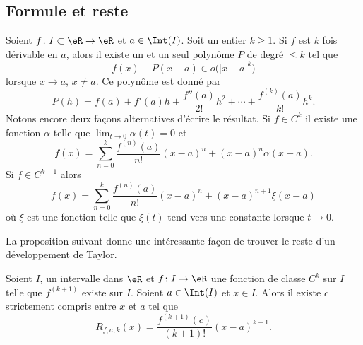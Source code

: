 \subsection{Formule et reste}

\begin{proposition}     \label{PropDevTaylorPol}
    Soient $f\colon I\subset\eR\to \eR$ et $a\in\Int(I)$. Soit un entier $k\geq 1$. Si $f$ est $k$ fois dérivable en $a$, alors il existe un et un seul polynôme $P$ de degré $\leq k$ tel que
    \begin{equation}
        f(x)-P(x-a)\in o\big( | x-a |^k \big)
    \end{equation}
    lorsque $x\to a$, $x\neq a$. Ce polynôme  est donné par
    \begin{equation}
        P(h)=f(a)+f'(a)h+\frac{ f''(a) }{ 2! }h^2+\cdots+\frac{ f^{(k)}(a) }{ k! }h^k.
    \end{equation}
    Notons encore deux façons alternatives d'écrire le résultat. Si \( f\in C^k\) il existe une fonction \( \alpha\) telle que \( \lim_{t\to 0} \alpha(t)=0\) et
    \begin{equation}
        f(x)=\sum_{n=0}^k\frac{ f^{(n)}(a) }{ n! }(x-a)^n+(x-a)^n\alpha(x-a).
    \end{equation}
    Si \( f\in C^{k+1}\) alors
    \begin{equation}        \label{EquQtpoN}
        f(x)=\sum_{n=0}^k\frac{ f^{(n)}(a) }{ n! }(x-a)^n+(x-a)^{n+1}\xi(x-a)
    \end{equation}
    où \( \xi\) est une fonction telle que \( \xi(t)\) tend vers une constante lorsque \( t\to 0\).
\end{proposition}

La proposition suivant donne une intéressante façon de trouver le reste d'un développement de Taylor.
\begin{proposition}     \label{PropResteTaylorc}
Soient $I$, un intervalle dans $\eR$ et $f\colon I\to \eR$ une fonction de classe $C^k$ sur $I$ telle que $f^{(k+1)}$ existe sur $I$. Soient $a\in\Int(I)$ et $x\in I$. Alors il existe $c$ strictement compris entre $x$ et $a$ tel que 
\begin{equation}
    R_{f,a,k}(x)=\frac{ f^{(k+1)}(c) }{ (k+1)! }(x-a)^{k+1}.
\end{equation}
\end{proposition}


